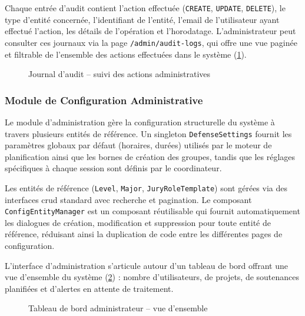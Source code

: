 Chaque entrée d'audit contient l'action effectuée (\texttt{CREATE}, \texttt{UPDATE}, \texttt{DELETE}), le type d'entité concernée, l'identifiant de l'entité, l'email de l'utilisateur ayant effectué l'action, les détails de l'opération et l'horodatage. L'administrateur peut consulter ces journaux via la page \texttt{/admin/audit-logs}, qui offre une vue paginée et filtrable de l'ensemble des actions effectuées dans le système (\cref{fig:admin-audit}).

\begin{figure}[H]
    \centering
    \caption{Journal d'audit -- suivi des actions administratives}
    \label{fig:admin-audit}
\end{figure}

\subsubsection{Module de Configuration Administrative}
\label{ch4:module_config}

Le module d'administration gère la configuration structurelle du système à travers plusieurs entités de référence. Un singleton \texttt{DefenseSettings} fournit les paramètres globaux par défaut (horaires, durées) utilisés par le moteur de planification ainsi que les bornes de création des groupes, tandis que les réglages spécifiques à chaque session sont définis par le coordinateur.

Les entités de référence (\texttt{Level}, \texttt{Major}, \texttt{JuryRoleTemplate}) sont gérées via des interfaces \acrshort{crud} standard avec recherche et pagination. Le composant \texttt{ConfigEntityManager} est un composant réutilisable qui fournit automatiquement les dialogues de création, modification et suppression pour toute entité de référence, réduisant ainsi la duplication de code entre les différentes pages de configuration.

L'interface d'administration s'articule autour d'un tableau de bord offrant une vue d'ensemble du système (\cref{fig:admin-dashboard}) : nombre d'utilisateurs, de projets, de soutenances planifiées et d'alertes en attente de traitement.

\begin{figure}[H]
    \centering
    \caption{Tableau de bord administrateur -- vue d'ensemble}
    \label{fig:admin-dashboard}
\end{figure}

